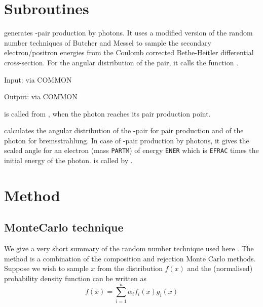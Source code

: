 
\section{Subroutines}

 generates \Pem\Pep-pair production by photons.
It uses a modified version
of the random number techniques of Butcher and Messel \cite{bib-BUTC}
to sample the secondary electron/positron energies from the Coulomb
corrected Bethe-Heitler differential cross-section.
For the angular distribution of the pair, it calls the function
.

Input:    via COMMON 

Output:   via COMMON 

 is called from ,
when the photon reaches its pair production point.

 calculates the angular distribution of the \Pem\Pep-pair
for pair production and of the photon for bremsstrahlung.
In case of \Pem\Pep-pair production by photons, it gives the
scaled angle for an electron (mass {\tt PARTM}) of energy {\tt ENER}
which is {\tt EFRAC} times the initial energy of the photon.
 is called by .

\section{ Method}

\subsection{MonteCarlo technique}
We give a very short summary of the random number technique used here
.
The method is a combination of the composition and
rejection Monte Carlo methods. Suppose we wish to sample $x$ from
the distribution $f(x)$ and the
(normalised) probability density function can be written as
\begin{equation}
f(x)  = \sum_{i=1}^{n}\alpha _{i} f _{i} (x) g_{i} (x)
\end{equation}

